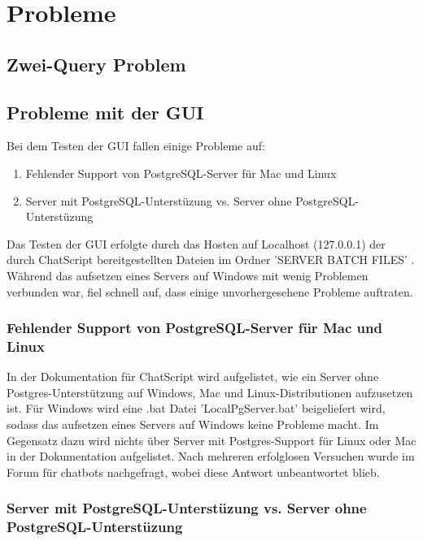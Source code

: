 \chapter{Probleme}
\label{sec:Probleme}


\section{Zwei-Query Problem}
\label{Section: Zwei-Query Problem}

\section{Probleme mit der GUI}
\label{sec: Probleme mit der GUI}

Bei dem Testen der GUI fallen einige Probleme auf: 

\begin{enumerate}
\item{Fehlender Support von PostgreSQL-Server für Mac und Linux}
\item{Server mit PostgreSQL-Unterstüzung vs. Server ohne PostgreSQL-Unterstüzung}
\end{enumerate}

Das Testen der GUI erfolgte durch das Hosten auf Localhost (127.0.0.1) der durch ChatScript bereitgestellten Dateien im Ordner 'SERVER BATCH FILES' \citep{chatscript2019}. Während das aufsetzen eines Servers auf Windows mit wenig Problemen verbunden war, fiel schnell auf, dass einige unvorhergesehene Probleme auftraten. 

\subsection{Fehlender Support von PostgreSQL-Server für Mac und Linux}
\label{sec:Fehlender Support von PostgreSQL-Server für Mac und Linux}

In der Dokumentation für ChatScript wird aufgelistet, wie ein Server ohne Postgres-Unterstützung auf Windows, Mac und Linux-Distributionen aufzusetzen ist. Für Windows wird eine .bat Datei 'LocalPgServer.bat' beigeliefert wird, sodass das aufsetzen eines Servers auf Windows keine Probleme macht. Im Gegensatz dazu wird nichts über Server mit Postgres-Support für Linux oder Mac in der Dokumentation aufgelistet. Nach mehreren erfolglosen Versuchen wurde im Forum für chatbots nachgefragt, wobei diese Antwort unbeantwortet blieb. 

\subsection{Server mit PostgreSQL-Unterstüzung vs. Server ohne PostgreSQL-Unterstüzung}
\label{sec: Server mit PostgreSQL-Unterstüzung vs. Server ohne PostgreSQL-Unterstüzung}

